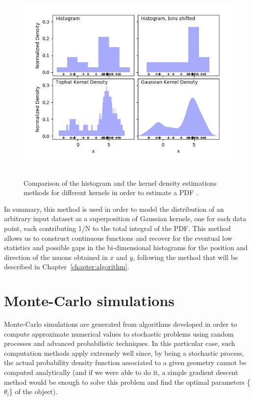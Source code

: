 \documentclass[a4paper, 11pt]{report}
\begin{document}
\begin{figure}[htbp]
\centering
\includegraphics[width=13cm, height=10cm]{figs/kernels.png}
\caption{Comparison of the histogram and the kernel density estimations methods for different kernels in order to estimate a PDF \cite{scikit}.}
\label{fig:KGR}
\end{figure}

In summary, this method is used in order to model the distribution of an arbitrary input dataset as a superposition of Gaussian kernels, one for each data point, each contributing 1/N to the total integral of the PDF. This method allows us to construct continuous functions and recover for the eventual low statistics and possible gaps in the bi-dimensional histograms for the position and direction of the muons obtained in $x$ and $y$, following the method that will be described in Chapter~\ref{chapter:algorithm}.

\section{Monte-Carlo simulations} \label{sec:MC}

Monte-Carlo simulations are generated from algorithms developed in order to compute approximate numerical values to stochastic problems using random processes and advanced probabilistic techniques. In this particular case, such computation methods apply extremely well since, by being a stochastic process, the actual probability density function associated to a given geometry cannot be computed analytically (and if we were able to do it, a simple gradient descent method would be enough to solve this problem and find the optimal parameters \{$\theta_i$\} of the object). 
\end{document}
